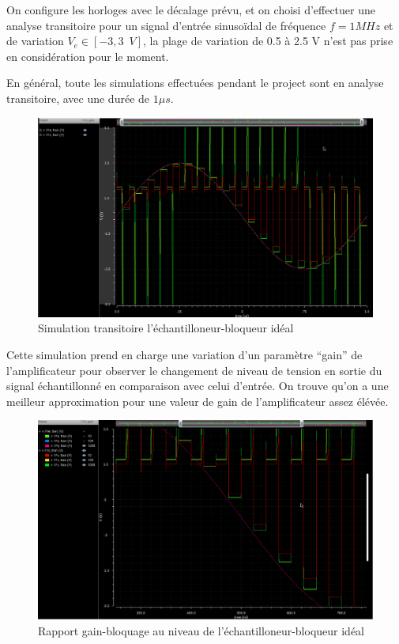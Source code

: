 \documentclass[11pt]{article}
\begin{document}
\clearpage

On configure les horloges avec le d\'ecalage pr\'evu, et on choisi d'effectuer
une analyse transitoire pour un signal d'entr\'ee sinuso\"idal de fr\'equence
$f = 1 MHz$ et de variation $V_e \in [-3, 3\phantom{1}V]$, la plage de variation
de 0.5 \`a 2.5 V n'est pas prise en consid\'eration pour le moment.

En g\'en\'eral, toute les simulations effectu\'ees pendant le project sont en analyse
transitoire, avec une dur\'ee de $1 \mu s$.

\begin{figure}[!htb]
\begin{center}
  \includegraphics[width=0.8\linewidth]{simu_ech_bloqueur.png}
  \caption{Simulation transitoire l'\'echantilloneur-bloqueur id\'eal}
\end{center}
\end{figure}

Cette simulation prend en charge une variation d'un param\`etre ``gain'' de l'amplificateur
pour observer le changement de niveau de tension en sortie du signal \'echantillonn\'e
en comparaison avec celui d'entr\'ee. On trouve qu'on a une meilleur approximation pour une
valeur de gain de l'amplificateur assez \'el\'ev\'ee.

\begin{figure}[!htb]
\begin{center}
  \includegraphics[width=0.725\linewidth]{rapport_gain_bloquage.png}
  \caption{Rapport gain-bloquage au niveau de l'\'echantilloneur-bloqueur id\'eal}
\end{center}
\end{figure}
\end{document}
